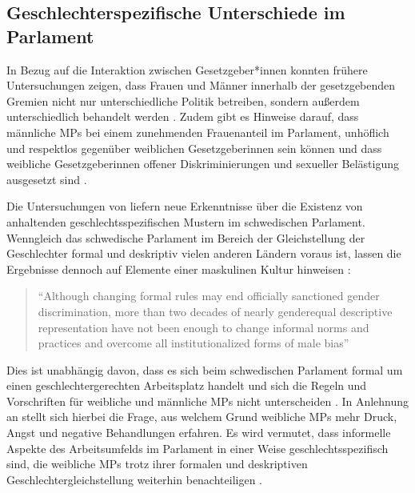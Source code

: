 \documentclass[12pt, 
    twoside=false, 
    bibliography=totoc, 
    numbers=endperiod, 
    headings=normal, 
    toc=chapterentrydotfill
    ]{scrbook}
\begin{document}
\subsection{Geschlechterspezifische Unterschiede im Parlament}\label{kapitel:geschlechterunterschiede}

In Bezug auf die Interaktion zwischen Gesetzgeber*innen konnten frühere Untersuchungen zeigen, dass Frauen und Männer innerhalb der gesetzgebenden Gremien nicht nur unterschiedliche Politik betreiben, sondern außerdem unterschiedlich behandelt werden \parencites[201]{erikson_2018}{childs_2004}. Zudem gibt es Hinweise darauf, dass männliche MPs bei einem zunehmenden Frauenanteil im Parlament, unhöflich und respektlos gegenüber weiblichen Gesetzgeberinnen sein können \parencites[201]{erikson_2018}{kathlene_1994} und dass weibliche Gesetzgeberinnen offener Diskriminierungen und sexueller Belästigung ausgesetzt sind \parencites[201]{erikson_2018}[76]{lovenduski_2005}{lovenduski_2004}.

Die Untersuchungen von \textcite{erikson_2018} liefern neue Erkenntnisse über die Existenz von anhaltenden geschlechtsspezifischen Mustern im schwedischen Parlament. Wenngleich das schwedische Parlament im Bereich der Gleichstellung der Geschlechter formal und deskriptiv vielen anderen Ländern voraus ist, lassen die Ergebnisse dennoch auf Elemente einer maskulinen Kultur hinweisen \parencite[211]{erikson_2018}:

\citereset
\begin{quote}
    \enquote{Although changing formal rules may end officially sanctioned gender discrimination, more than two decades of nearly genderequal descriptive representation have not been enough to change informal norms and practices and overcome all institutionalized forms of male bias} \parencite[211]{erikson_2018}
\end{quote}

 Dies ist unabhängig davon, dass es sich beim schwedischen Parlament formal um einen geschlechtergerechten Arbeitsplatz handelt und sich die Regeln und Vorschriften für weibliche und männliche MPs nicht unterscheiden \parencite[211]{erikson_2018}. In Anlehnung an \citeauthor{erikson_2018} stellt sich hierbei die Frage, aus welchem Grund weibliche MPs mehr Druck, Angst und negative Behandlungen erfahren. Es wird vermutet, dass informelle Aspekte des Arbeitsumfelds im Parlament in einer Weise geschlechtsspezifisch sind, die weibliche MPs trotz ihrer formalen und deskriptiven Geschlechtergleichstellung weiterhin benachteiligen \parencite[210]{erikson_2018}.
\end{document}
